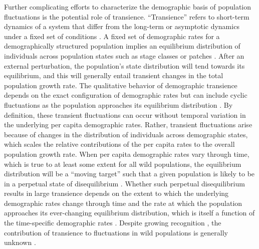 \documentclass[11pt]{article}
\begin{document}
Further complicating efforts to characterize the demographic basis 
of population fluctuations is the potential role of transience.
``Transience'' refers to short-term dynamics of a system 
that differ from the long-term or asymptotic dynamics under a fixed set of conditions
\citep{hastings2010}.
A fixed set of demographic rates for a demographically structured population 
implies an equilibrium distribution
of individuals across population states such as stage classes or patches
\citep{caswell2001matrix}.
After an external perturbation, 
the population's state distribution will tend towards its equilibrium,
and this will generally entail transient changes 
in the total population growth rate.
The qualitative behavior of demographic transience depends
on the exact configuration of demographic rates
but can include cyclic fluctuations 
as the population approaches its equilibrium distribution
\citep{caswell2001matrix}.
By definition, these transient fluctuations can occur without
temporal variation in the underlying per capita demographic rates.
Rather, transient fluctuations arise because 
of changes in the distribution of individuals across demographic states,
which scales the relative contributions of the per capita rates 
to the overall population growth rate.
When per capita demographic rates vary through time,
which is true to at least some extent for all wild populations,
the equilibrium distribution will be a ``moving target''
such that a given population is likely to be in a perpetual state of disequilibrium
\citep{fox2000population, koons2017understanding}.
Whether such perpetual disequilibrium results in large transience 
depends on the extent to which the underlying demographic rates change through time
and the rate at which the population approaches its ever-changing equilibrium distribution,
which is itself a function of the time-specific demographic rates
\citep{caswell2005reactivity, caswell2007sensitivity}.
Despite growing recognition
\citep{caswell2007sensitivity, koons2017understanding},
the contribution of transience to fluctuations in wild populations is generally unknown
\citep[but see][]{hoy2020fluctuations}.
\end{document}
